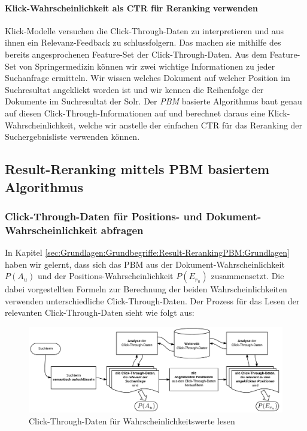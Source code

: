 \paragraph{Klick-Wahrscheinlichkeit als CTR für Reranking verwenden} 
Klick-Modelle versuchen die Click-Through-Daten zu interpretieren und aus ihnen ein Relevanz-Feedback zu schlussfolgern. Das machen sie mithilfe des bereits angesprochenen Feature-Set der Click-Through-Daten. Aus dem Feature-Set von Springermedizin können wir zwei wichtige Informationen zu jeder Suchanfrage ermitteln. Wir wissen welches Dokument auf welcher Position im Suchresultat angeklickt worden ist und wir kennen die Reihenfolge der Dokumente im Suchresultat der Solr. Der \textit{PBM} basierte Algorithmus baut genau auf diesen Click-Through-Informationen auf und berechnet daraus eine Klick-Wahrscheinlichkeit, welche wir anstelle der einfachen CTR für das Reranking der Suchergebnisliste verwenden können. 

\subsection{Result-Reranking mittels PBM basiertem Algorithmus}
\label{sec:Reranking:Methodik:Result-RerankingPBM}

\subsubsection{Click-Through-Daten für Positions- und Dokument-Wahrscheinlichkeit abfragen}
\label{sec:Reranking:Methodik:Result-RerankingPBM:PositionDokumentWahrscheinlichkeiten}

In Kapitel \ref{sec:Grundlagen:Grundbegriffe:Result-RerankingPBM:Grundlagen} haben wir gelernt, dass sich das PBM aus der Dokument-Wahrscheinlichkeit $P(A_{u})$ und der Positions-Wahrscheinlichkeit $P(E_{r_{u}})$ zusammensetzt. Die dabei vorgestellten Formeln zur Berechnung der beiden Wahrscheinlichkeiten verwenden unterschiedliche Click-Through-Daten. Der Prozess für das Lesen der relevanten Click-Through-Daten sieht wie folgt aus:

\begin{figure}[H]
\centering
\vspace{-1em}
\caption[Click-Through-Daten für Wahrscheinlichkeitswerte lesen]{Click-Through-Daten für Wahrscheinlichkeitswerte lesen}
\label{fig:WahrscheinlichkeitswerteCTDaten}
\includegraphics[width=\linewidth]{gfx/WahrscheinlichkeitswerteCTDaten}
\vspace{-2.5em}
\end{figure}

